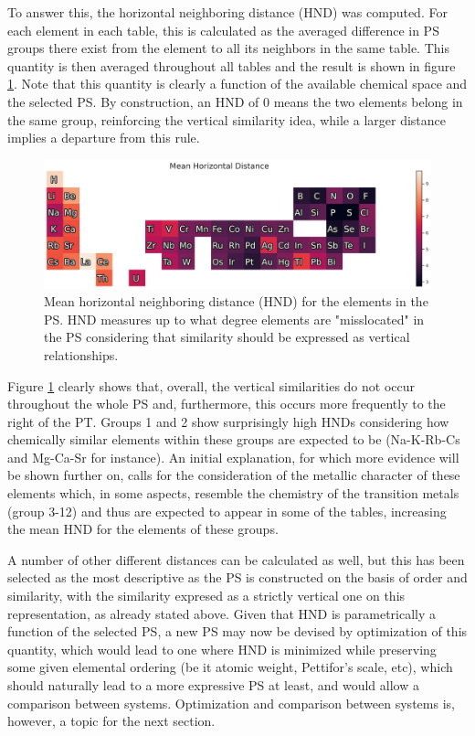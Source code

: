 \documentclass[]{article}
\begin{document}
To answer this, the horizontal neighboring distance (HND) was computed. For each element in each table, this is calculated as the averaged difference in PS groups there exist from the element to all its neighbors in the same table. This quantity is then averaged throughout all tables and the result is shown in figure \ref{fig:fig2}. Note that this quantity is clearly a function of the available chemical space and the selected PS. By construction, an HND of 0 means the two elements belong in the same group, reinforcing the vertical similarity idea, while a larger distance implies a departure from this rule.

\begin{figure}[h!]
  \centering
	\includegraphics[width=16.0cm]{meanHND.png}
	\caption{Mean horizontal neighboring distance (HND) for the elements in the PS. HND measures up to what degree elements are "misslocated" in the PS considering that similarity should be expressed as vertical relationships. }
	\label{fig:fig2}
\end{figure}

Figure \ref{fig:fig2} clearly shows that, overall, the vertical similarities do not occur throughout the whole PS and, furthermore, this occurs more frequently to the right of the PT. Groups 1 and 2 show surprisingly high HNDs considering how chemically similar elements within these groups are expected to be (Na-K-Rb-Cs and Mg-Ca-Sr for instance). An initial explanation, for which more evidence will be shown further on, calls for the consideration of the metallic character of these elements which, in some aspects, resemble the chemistry of the transition metals (group 3-12) and thus are expected to appear in some of the tables, increasing the mean HND for the elements of these groups.

A number of other different distances can be calculated as well, but this has been selected as the most descriptive as the PS is constructed on the basis of order and similarity, with the similarity expresed as a strictly vertical one on this representation, as already stated above. Given that HND is parametrically a function of the selected PS, a new PS may now be devised by optimization of this quantity, which would lead to one where HND is minimized while preserving some given elemental ordering (be it atomic weight, Pettifor's scale, etc), which should naturally lead to a more expressive PS at least, and would allow a comparison between systems. Optimization and comparison between systems is, however, a topic for the next section.
\end{document}
